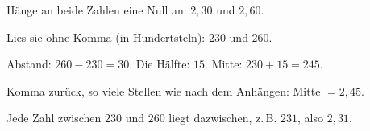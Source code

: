 \documentclass[11pt]{article}
\begin{document}
\noindent\begin{minipage}[t]{0.6\linewidth}\vspace{0pt}\par\noindent{}Hänge an beide Zahlen eine Null an: $2{,}30$ und $2{,}60$.\par\smallskip\par\noindent{}Lies sie ohne Komma (in Hundertsteln): $230$ und $260$.\par\smallskip\par\noindent{}Abstand: $260 - 230 = 30$. Die Hälfte: $15$. Mitte: $230 + 15 = 245$.\par\smallskip\par\noindent{}Komma zurück, so viele Stellen wie nach dem Anhängen: Mitte $= 2{,}45$.\par\smallskip\par\noindent{}Jede Zahl zwischen $230$ und $260$ liegt dazwischen, z.\,B. $231$, also $2{,}31$.\par\smallskip\end{minipage}\hfill
\end{document}
